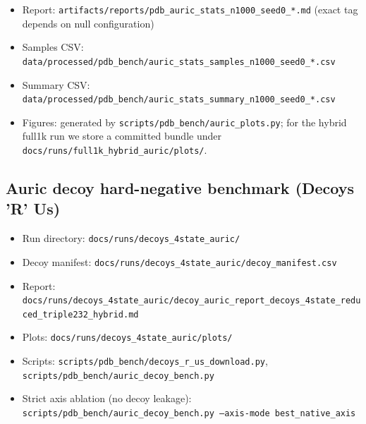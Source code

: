 \begin{itemize}
  \begin{itemize}
    \item Report: \texttt{artifacts/reports/pdb\_auric\_stats\_n1000\_seed0\_*.md} (exact tag depends on null configuration)
    \item Samples CSV: \texttt{data/processed/pdb\_bench/auric\_stats\_samples\_n1000\_seed0\_*.csv}
    \item Summary CSV: \texttt{data/processed/pdb\_bench/auric\_stats\_summary\_n1000\_seed0\_*.csv}
    \item Figures: generated by \texttt{scripts/pdb\_bench/auric\_plots.py}; for the hybrid full1k run we store a committed bundle under \texttt{docs/runs/full1k\_hybrid\_auric/plots/}.
  \end{itemize}
\end{itemize}

\subsection*{Auric decoy hard-negative benchmark (Decoys 'R' Us)}
\begin{itemize}
  \item Run directory: \texttt{docs/runs/decoys\_4state\_auric/}
  \item Decoy manifest: \texttt{docs/runs/decoys\_4state\_auric/decoy\_manifest.csv}
  \item Report: \texttt{docs/runs/decoys\_4state\_auric/decoy\_auric\_report\_decoys\_4state\_reduced\_triple232\_hybrid.md}
  \item Plots: \texttt{docs/runs/decoys\_4state\_auric/plots/}
  \item Scripts: \texttt{scripts/pdb\_bench/decoys\_r\_us\_download.py}, \texttt{scripts/pdb\_bench/auric\_decoy\_bench.py}
  \item Strict axis ablation (no decoy leakage): \texttt{scripts/pdb\_bench/auric\_decoy\_bench.py --axis-mode best\_native\_axis}
\end{itemize}

